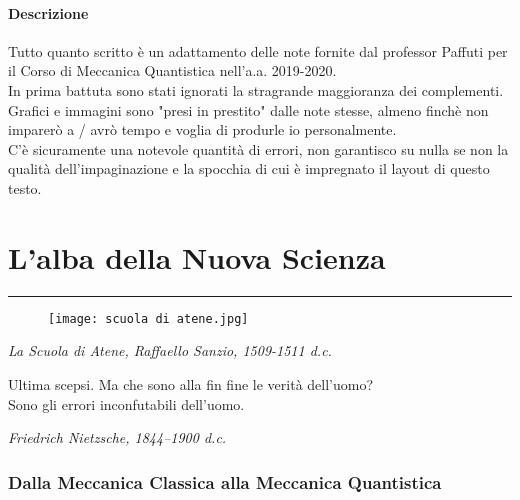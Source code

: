 \documentclass[twoside]{article}
\begin{document}
\subsection*{Descrizione}
Tutto quanto scritto è un adattamento delle note fornite dal professor Paffuti per il Corso di Meccanica Quantistica nell'a.a. 2019-2020.\\
In prima battuta sono stati ignorati la stragrande maggioranza dei complementi.\\
Grafici e immagini sono "presi in prestito" dalle note stesse, almeno finchè non imparerò a / avrò tempo e voglia di produrle io personalmente.\\
C'è sicuramente una notevole quantità di errori, non garantisco su nulla se non la qualità dell'impaginazione e la spocchia di cui è impregnato il layout di questo testo. \\

\vspace{1.5 mm}

\newpage

\setcounter{section}{0}

\tableofcontents

\newpage

\part{L'alba della Nuova Scienza}
\rule{\textwidth}{1pt}
\vspace{2cm}

\begin{figure}[h]
\centering
\texttt{[image: scuola di atene.jpg]}
\label{fig:Atene}
\end{figure}
\hfill \textit{La Scuola di Atene, Raffaello Sanzio, 1509-1511 d.c.}

\vfill

\epigraph{Ultima scepsi. Ma che sono alla fin fine le verità dell'uomo? \\ Sono gli errori inconfutabili dell'uomo.}{\textit{Friedrich Nietzsche, 1844–1900 d.c.}}

\newpage

\section{Dalla Meccanica Classica alla Meccanica Quantistica}
\end{document}
